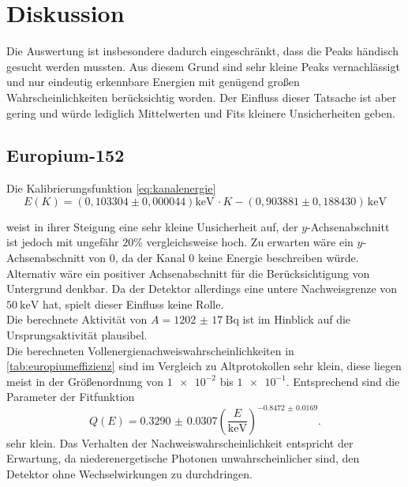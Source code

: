 \section{Diskussion}
\label{sec:Diskussion}

Die Auswertung ist insbesondere dadurch eingeschränkt, dass die Peaks händisch gesucht werden mussten. Aus diesem Grund sind sehr kleine Peaks vernachlässigt
und nur eindeutig erkennbare Energien mit genügend großen Wahrscheinlichkeiten berücksichtig worden. Der Einfluss dieser Tatsache ist aber gering und würde lediglich Mittelwerten und Fits kleinere Unsicherheiten geben.

\subsection{Europium-152}

Die Kalibrierungsfunktion \eqref{eq:kanalenergie}
\begin{equation}
    E(K) = (0,103304 \pm 0,000044) \si{\kilo\electronvolt} \, \cdot K - (0,903881 \pm 0,188430) \, \si{\kilo\electronvolt}
\end{equation}

weist in ihrer Steigung eine sehr kleine Unsicherheit auf, der $y$-Achsenabschnitt ist jedoch mit ungefähr $20 \%$ vergleichsweise hoch.
Zu erwarten wäre ein $y$-Achsenabschnitt von $0$, da der Kanal $0$ keine Energie beschreiben würde. Alternativ wäre ein positiver Achsenabschnitt
für die Berücksichtigung von Untergrund denkbar. Da der Detektor allerdings eine untere Nachweisgrenze von $\qty{50}{\kilo\electronvolt}$ hat, spielt dieser Einfluss keine Rolle.\\

Die berechnete Aktivität von $A = \qty{1202(17)}{\becquerel}$ ist im Hinblick auf die Ursprungsaktivität plausibel.\\

Die berechneten Vollenergienachweiswahrscheinlichkeiten in \ref{tab:europiumeffizienz} sind im Vergleich zu Altprotokollen sehr klein, diese liegen meist in der Größenordnung von $\num{1e-2}$ bis $\num{1e-1}$. Entsprechend sind die Parameter
der Fitfunktion
\begin{equation}
    Q(E) = \num{0.3290(307)} (\frac{E}{\si{\kilo\electronvolt}})^{\num{-0.8472(169)}}.
\end{equation}
sehr klein. Das Verhalten der Nachweiswahrscheinlichkeit entspricht der Erwartung, da niederenergetische Photonen unwahrscheinlicher sind, den Detektor ohne Wechselwirkungen zu durchdringen.\\

